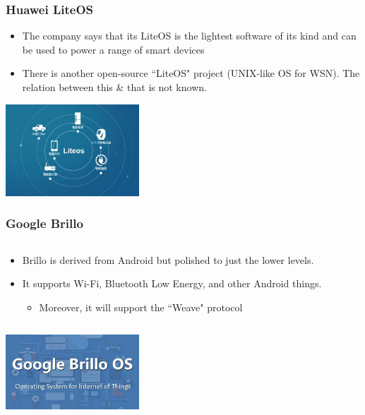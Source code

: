 \documentclass{beamer}
\begin{document}
\begin{frame}
	\frametitle{Huawei LiteOS}
	\begin{itemize}
		\justifying
		\item The company says that its \textcolor{TextOrange}{LiteOS} is the \textcolor{TextGreen}{lightest} software of its kind and can be used to power a range of smart devices
		\item There is another open-source ``LiteOS" project (UNIX-like OS for WSN). The relation between this \& that is not known.
		\end{itemize}
	\vspace{.5cm}
	\hspace*{5.5cm} \includegraphics[width=5cm]{figs/huawei-liteos-logo.jpg}
\end{frame}

\begin{frame}
	\frametitle{Google Brillo}
	\begin{columns}[c]
		\begin{column}{30cm}
			\vspace{.1cm}
			\begin{itemize}
				\justifying
				\item Brillo is \textcolor{TextGreen}{derived} from Android
				but \textcolor{TextGreen}{polished} to just the lower levels.
				\item It supports Wi-Fi, Bluetooth Low Energy, and other Android things.
				\begin{itemize}
					\item Moreover, it will support the ``Weave" protocol
				\end{itemize}
			\end{itemize}
		\end{column}
	\end{columns}
	\vspace{.5cm}
	\hspace*{5.5cm} \includegraphics[width=5cm]{figs/google-brillo-logo.jpeg}
\end{frame}
\end{document}
